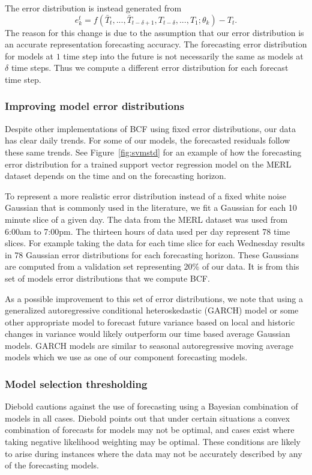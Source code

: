 \documentclass{acm_proc_article-sp}
\begin{document}
The error distribution is instead generated from 
\begin{equation}
e^{t}_{k} = f(\bar{T}_{t}, ..., \bar{T}_{t - \delta + 1}, T_{t - \delta}, ..., T_{1};\theta_{k}) - T_{t}.
\end{equation}
The reason for this change is due to the assumption that our error distribution is an accurate representation forecasting accuracy.  
The forecasting error distribution for models at $1$ time step into the future is not necessarily the same as models at $\delta$ time steps.  Thus we compute a different error distribution for each forecast time step.


\subsubsection{Improving model error distributions}
Despite other implementations of BCF using fixed error distributions, our data has clear daily trends.  For some of our models, the forecasted residuals follow these same trends.  See Figure~\ref{fig:svmstd} for an example of how the forecasting error distribution for a trained support vector regression model on the MERL dataset depends on the time and on the forecasting horizon.

To represent a more realistic error distribution instead of a fixed white noise Gaussian that is commonly used in the literature, we fit a Gaussian for each 10 minute slice of a given day.  The data from the MERL dataset was used from 6:00am to 7:00pm. The thirteen hours of data used per day represent 78 time slices.  For example taking the data for each time slice for each Wednesday results in 78 Gaussian error distributions for each forecasting horizon.  These Gaussians are computed from a validation set representing 20\% of our data.  It is from this set of models error distributions that we compute BCF.

As a possible improvement to this set of error distributions, we note that using a generalized autoregressive conditional heteroskedastic (GARCH) model \cite{Box2008} or some other appropriate model to forecast future variance based on local and historic changes in variance would likely outperform our time based average Gaussian models.  GARCH models are similar to seasonal autoregressive moving average models which we use as one of our component forecasting models.

\subsubsection{Model selection thresholding}
Diebold \cite{Diebold1991} cautions against the use of forecasting using a Bayesian combination of models in all cases.  Diebold points out that under certain situations a convex combination of forecasts for models may not be optimal, and cases exist where taking negative likelihood weighting may be optimal.  These conditions are likely to arise during instances where the data may not be accurately described by any of the forecasting models.  
\end{document}

